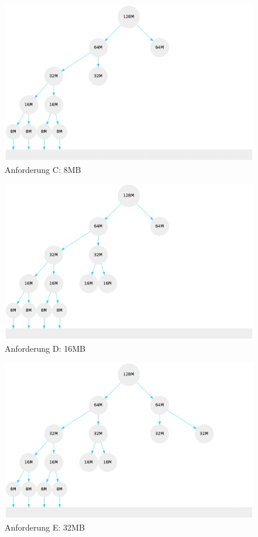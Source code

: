 \documentclass[11pt, a4paper]{scrartcl}
\begin{document}
\begin{figure}[H]
\center
\includegraphics[scale=0.32]{a1_2}
\caption{Anforderung C: 8MB}
\end{figure}
\begin{figure}[H]
\center
\includegraphics[scale=0.32]{a1_3}
\caption{Anforderung D: 16MB}
\end{figure}
\begin{figure}[H]
\center
\includegraphics[scale=0.32]{a1_4}
\caption{Anforderung E: 32MB}
\end{figure}
\end{document}
